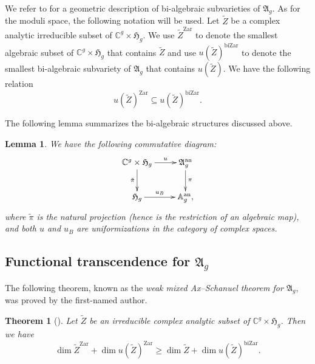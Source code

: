 \documentclass[12pt,oneside]{amsart}
\newcounter{maincounter}
\numberwithin{maincounter}{section}
\numberwithin{equation}{section}
\newtheorem{lemma}[maincounter]{Lemma}
\newtheorem{theorem}[maincounter]{Theorem}
\def\CC{\mathbb{C}}
\newcommand{\IC}{{\CC}}
\begin{document}
We refer to \cite[Proposition~5.3]{GaoBettiRank} for a geometric description of bi-algebraic subvarieties of $\mathfrak{A}_g$. 
As for the moduli space, the following notation will be used. Let
$\tilde{Z}$ be a complex analytic irreducible subset of $\IC^g \times
\mathfrak{H}_g$. We use $\tilde{Z}^{\mathrm{Zar}}$ to denote the
smallest algebraic subset of $\IC^g \times \mathfrak{H}_g$ that
contains $\tilde{Z}$
and use $u(\tilde{Z})^{\mathrm{biZar}}$ to
denote the smallest bi-algebraic subvariety of $\mathfrak{A}_g$ that
contains $u(\tilde{Z})$. We have the following relation %
\begin{equation}
  u(\tilde{Z})^{\mathrm{Zar}} \subseteq u(\tilde{Z})^{\mathrm{biZar}}.
\end{equation}



The following lemma summarizes the bi-algebraic structures discussed above.
\begin{lemma}
We have the following  commutative diagram:
\begin{equation*}
\xymatrix{
 \IC^g \times \mathfrak{H}_g  \ar[r]^-{u} \ar[d]_{\tilde{\pi}} & \mathfrak{A}_g^{\mathrm{an}} \ar[d]^{\pi} \\ \mathfrak{H}_g \ar[r]^-{u_B} & \mathbb{A}_g^{\mathrm{an}},
}
\end{equation*}
where $\tilde{\pi}$ is the natural projection (hence is the
restriction of an algebraic map), and both $u$ and $u_B$ are uniformizations in the category of complex spaces.
\end{lemma}


\subsection{Functional transcendence for $\mathfrak{A}_g$}
The following theorem, known as the \textit{weak mixed Ax--Schanuel
  theorem for $\mathfrak{A}_g$}, was
proved by the first-named author.
\begin{theorem}[{\!\!\cite[Theorem~3.5]{GaoMixedAS}}]\label{ThmAS}
Let $\tilde{Z}$ be an irreducible complex analytic 
subset of $\IC^g \times\mathfrak{H}_g$. Then we have
\[
\dim \tilde{Z}^{\mathrm{Zar}} + \dim u(\tilde{Z})^{\mathrm{Zar}} \ge \dim \tilde{Z} + \dim u(\tilde{Z})^{\mathrm{biZar}}.
\]
\end{theorem}
\end{document}
